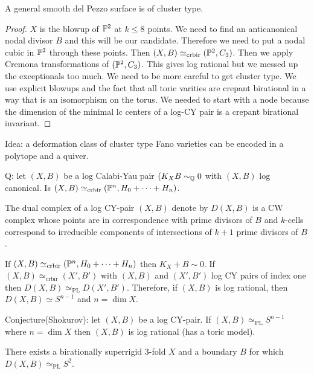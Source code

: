 \documentclass[12pt]{article}
\begin{document}
\begin{theorem}
A general smooth del Pezzo surface is of cluster type. 
\end{theorem}

\begin{proof}
$X$ is the blowup of $\P^2$ at $k \le 8$ points. We need to find an anticanonical nodal divisor $B$ and this will be our candidate. Therefore we need to put a nodal cubic in $\P^2$ through these points. Then $(X, B) \simeq_{\text{crbir}} (\P^2, C_3)$. Then we apply Cremona transformations of $(\P^2, C_3)$. This gives log rational but we messed up the exceptionals too much. We need to be more careful to get cluster type. We use explicit blowups and the fact that all toric varities are crepant birational in a way that is an isomorphism on the torus. We needed to start with a node because the dimension of the minimal lc centers of a log-CY pair is a crepant birational invariant. 
\end{proof}

Idea: a deformation class of cluster type Fano varieties can be encoded in a polytope and a quiver. 

Q: let $(X, B)$ be a log Calabi-Yau pair $(K_X B \sim_{\Q} 0$ with $(X, B)$ log canonical. Is $(X, B) \simeq_{\text{crbir}} (\P^n, H_0 + \cdots + H_n)$. 

\begin{defn}
The dual complex of a log CY-pair $(X,B)$ denote by $D(X,B)$ is a CW complex whose points are in correspondence with prime divisors of $B$ and $k$-cells correspond to irreducible components of intersections of $k+1$ prime divisors of $B$. 
\end{defn}

\begin{rmk}
If $(X, B) \simeq_{\text{crbir}} (\P^n, H_0 + \cdots + H_n)$ then $K_X + B \sim 0$. If $(X, B) \simeq_{\text{crbir}} (X', B')$ with $(X,B)$ and $(X', B')$ log CY pairs of index one then $D(X, B) \simeq_{\text{PL}} D(X', B')$. Therefore, if $(X, B)$ is log rational, then $D(X,B) \simeq S^{n-1}$ and $n = \dim{X}$. 
\end{rmk}

Conjecture(Shokurov): let $(X, B)$ be a log CY-pair. If $(X, B) \simeq_{\text{PL}} S^{n-1}$ where $n = \dim{X}$ then $(X,B)$ is log rational (has a toric model). 

\begin{theorem}
There exists a birationally superrigid 3-fold $X$ and a boundary $B$ for which $D(X, B) \simeq_{\text{PL}} S^2$. 
\end{theorem}
\end{document}
